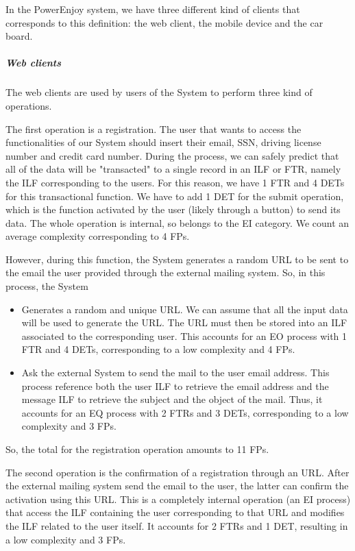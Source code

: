 In the PowerEnjoy system, we have three different kind of clients that corresponds to this definition: the web client, the mobile device and the car board.

\subparagraph{Web clients}
The web clients are used by users of the System to perform three kind of operations.

The first operation is a registration. The user that wants to access the functionalities of our System should insert their email, SSN, driving license number and credit card number. During the process, we can safely predict that all of the data will be "transacted" to a single record in an ILF or FTR, namely the ILF corresponding to the users. For this reason, we have 1 FTR and 4 DETs for this transactional function. We have to add 1 DET for the submit operation, which is the function activated by the user (likely through a button) to send its data. The whole operation is internal, so belongs to the EI category. We count an average complexity corresponding to 4 FPs.

However, during this function, the System generates a random URL to be sent to the email the user provided through the external mailing system. So, in this process, the System
\begin{itemize}
	\item Generates a random and unique URL. We can assume that all the input data will be used to generate the URL. The URL must then be stored into an ILF associated to the corresponding user. This accounts for an EO process with 1 FTR and 4 DETs, corresponding to a low complexity and 4 FPs.
	\item Ask the external System to send the mail to the user email address. This process reference both the user ILF to retrieve the email address and the message ILF to retrieve the subject and the object of the mail. Thus, it accounts for an EQ process with 2 FTRs and 3 DETs, corresponding to a low complexity and 3 FPs.
\end{itemize}
So, the total for the registration operation amounts to 11 FPs.
\smallskip

The second operation is the confirmation of a registration through an URL. After the external mailing system send the email to the user, the latter can confirm the activation using this URL. This is a completely internal operation (an EI process) that access the ILF containing the user corresponding to that URL and modifies the ILF related to the user itself. It accounts for 2 FTRs and 1 DET, resulting in a low complexity and 3 FPs.
\smallskip

